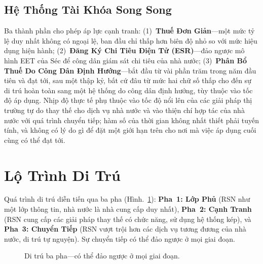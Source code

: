 \documentclass[11pt,a4paper,twocolumn]{article}
\begin{document}
\subsection{Hệ Thống Tài Khóa Song Song}

Ba thành phần cho phép áp lực cạnh tranh: (1)~\textbf{Thuế Đơn Giản}---một mức tỷ lệ duy nhất không có ngoại lệ, ban đầu chỉ thấp hơn biên độ nhỏ so với mức hiệu dụng hiện hành; (2)~\textbf{Đăng Ký Chi Tiêu Điện Tử (ESR)}---đảo ngược mô hình EET của Séc để công dân giám sát chi tiêu của nhà nước; (3)~\textbf{Phân Bổ Thuế Do Công Dân Định Hướng}---bắt đầu từ vài phần trăm trong năm đầu tiên và đạt tới, sau một thập kỷ, bất cứ đâu từ mức hai chữ số thấp cho đến sự di trú hoàn toàn sang một hệ thống do công dân định hướng, tùy thuộc vào tốc độ áp dụng. Nhịp độ thực tế phụ thuộc vào tốc độ nổi lên của các giải pháp thị trường tự do thay thế cho dịch vụ nhà nước và vào thiện chí hợp tác của nhà nước với quá trình chuyển tiếp; hàm số của thời gian không nhất thiết phải tuyến tính, và không có lý do gì để đặt một giới hạn trên cho nơi mà việc áp dụng cuối cùng có thể đạt tới.

\section{Lộ Trình Di Trú}

Quá trình di trú diễn tiến qua ba pha (Hình.~\ref{fig:migration}): \textbf{Pha~1: Lớp Phủ} (RSN như một lớp thông tin, nhà nước là nhà cung cấp duy nhất), \textbf{Pha~2: Cạnh Tranh} (RSN cung cấp các giải pháp thay thế có chức năng, sử dụng hệ thống kép), và \textbf{Pha~3: Chuyển Tiếp} (RSN vượt trội hơn các dịch vụ tương đương của nhà nước, di trú tự nguyện). Sự chuyển tiếp có thể đảo ngược ở mọi giai đoạn.

\begin{figure}[ht]
\centering
{}
\caption{Di trú ba pha---có thể đảo ngược ở mọi giai đoạn.}
\label{fig:migration}
\end{figure}
\end{document}
